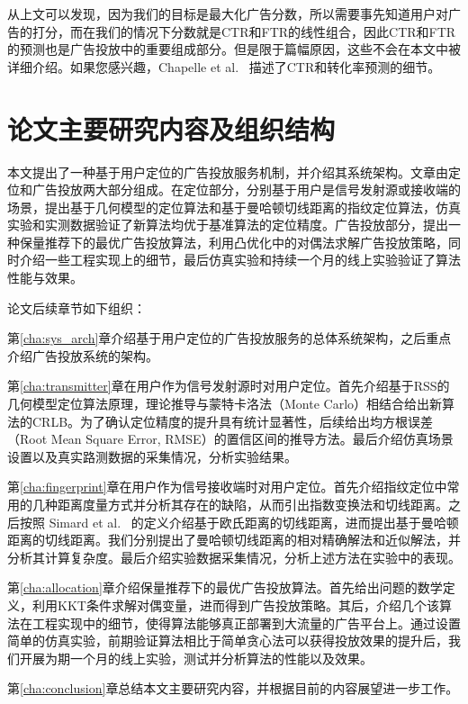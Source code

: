 从上文可以发现，因为我们的目标是最大化广告分数，所以需要事先知道用户对广告的打分，而在我们的情况下分数就是CTR和FTR的线性组合，因此CTR和FTR的预测也是广告投放中的重要组成部分。但是限于篇幅原因，这些不会在本文中被详细介绍。如果您感兴趣，Chapelle et al.~\cite{chapelle2015simple} 描述了CTR和转化率预测的细节。

\section{论文主要研究内容及组织结构}

本文提出了一种基于用户定位的广告投放服务机制，并介绍其系统架构。文章由定位和广告投放两大部分组成。在定位部分，分别基于用户是信号发射源或接收端的场景，提出基于几何模型的定位算法和基于曼哈顿切线距离的指纹定位算法，仿真实验和实测数据验证了新算法均优于基准算法的定位精度。广告投放部分，提出一种保量推荐下的最优广告投放算法，利用凸优化中的对偶法求解广告投放策略，同时介绍一些工程实现上的细节，最后仿真实验和持续一个月的线上实验验证了算法性能与效果。

论文后续章节如下组织：

第\ref{cha:sys_arch}章介绍基于用户定位的广告投放服务的总体系统架构，之后重点介绍广告投放系统的架构。

第\ref{cha:transmitter}章在用户作为信号发射源时对用户定位。首先介绍基于RSS的几何模型定位算法原理，理论推导与蒙特卡洛法（Monte Carlo）相结合给出新算法的CRLB。为了确认定位精度的提升具有统计显著性，后续给出均方根误差（Root Mean Square Error, RMSE）的置信区间的推导方法。最后介绍仿真场景设置以及真实路测数据的采集情况，分析实验结果。

第\ref{cha:fingerprint}章在用户作为信号接收端时对用户定位。首先介绍指纹定位中常用的几种距离度量方式并分析其存在的缺陷，从而引出指数变换法和切线距离。之后按照 Simard et al.~\cite{simard1998transformation} 的定义介绍基于欧氏距离的切线距离，进而提出基于曼哈顿距离的切线距离。我们分别提出了曼哈顿切线距离的相对精确解法和近似解法，并分析其计算复杂度。最后介绍实验数据采集情况，分析上述方法在实验中的表现。

第\ref{cha:allocation}章介绍保量推荐下的最优广告投放算法。首先给出问题的数学定义，利用KKT条件求解对偶变量，进而得到广告投放策略。其后，介绍几个该算法在工程实现中的细节，使得算法能够真正部署到大流量的广告平台上。通过设置简单的仿真实验，前期验证算法相比于简单贪心法可以获得投放效果的提升后，我们开展为期一个月的线上实验，测试并分析算法的性能以及效果。

第\ref{cha:conclusion}章总结本文主要研究内容，并根据目前的内容展望进一步工作。


